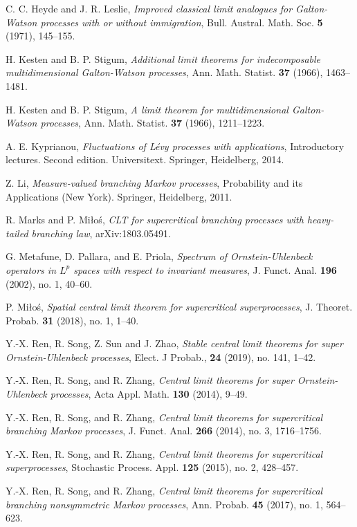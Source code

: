 \documentclass[12pt,a4paper]{amsart}
\theoremstyle{plain}
\theoremstyle{definition}
\numberwithin{equation}{section}
\begin{document}
\begin{thebibliography}{10}
  C. C. Heyde and J. R. Leslie,
  \emph{Improved classical limit analogues for {G}alton-{W}atson processes with or without immigration},
  Bull. Austral. Math. Soc. \textbf{5} (1971), 145--155.

  H. Kesten and B. P. Stigum,
  \emph{Additional limit theorems for indecomposable multidimensional {G}alton-{W}atson processes},
  Ann. Math. Statist. \textbf{37} (1966), 1463--1481.

  H. Kesten and B. P. Stigum,
  \emph{A limit theorem for multidimensional {G}alton-{W}atson processes},
  Ann. Math. Statist. \textbf{37} (1966), 1211--1223.

  A. E. Kyprianou,
  \emph{Fluctuations of {L}\'{e}vy processes with applications},
    Introductory lectures. Second edition. Universitext. Springer, Heidelberg, 2014.

  Z. Li,
  \emph{Measure-valued branching {M}arkov processes},
  Probability and its Applications (New York). Springer, Heidelberg, 2011.

  R. Marks and P. Mi{\l}o{\'s},
  \emph{C{LT} for supercritical branching processes with heavy-tailed branching law},
  arXiv:1803.05491.

  G. Metafune, D. Pallara, and E. Priola,
  \emph{Spectrum of {O}rnstein-{U}hlenbeck operators in {$L^p$} spaces with respect to invariant  measures},
  J. Funct. Anal. \textbf{196} (2002), no. 1, 40--60.

  P. Mi{\l}o{\'s},
  \emph{Spatial central limit theorem for supercritical superprocesses},
  J. Theoret. Probab. \textbf{31} (2018), no. 1, 1--40.

Y.-X. Ren, R. Song, Z. Sun and J. Zhao,
\emph{Stable central limit theorems for super Ornstein-Uhlenbeck processes},
Elect. J Probab., \textbf{24} (2019), no. 141, 1--42.

  Y.-X. Ren, R. Song, and R. Zhang,
  \emph{Central limit theorems for super {O}rnstein-{U}hlenbeck processes},
  Acta Appl. Math. \textbf{130} (2014), 9--49.

  Y.-X. Ren, R. Song, and R. Zhang,
  \emph{Central limit theorems for supercritical branching {M}arkov processes},
  J. Funct. Anal. \textbf{266} (2014), no. 3, 1716--1756.

  Y.-X. Ren, R. Song, and R. Zhang,
  \emph{Central limit theorems for supercritical superprocesses},
  Stochastic Process. Appl. \textbf{125} (2015), no. 2, 428--457.

  Y.-X. Ren, R. Song, and R. Zhang,
  \emph{Central limit theorems for supercritical branching nonsymmetric {M}arkov processes},
  Ann. Probab. \textbf{45} (2017), no. 1, 564--623.
  
\end{thebibliography}
\end{document}
